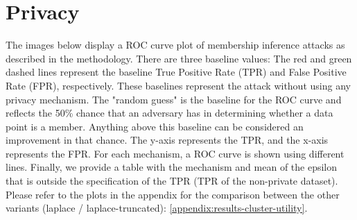 \section{Privacy}
The images below display a ROC curve plot of membership inference attacks as described in the methodology.
There are three baseline values: The red and green dashed lines represent the baseline True Positive Rate (TPR) and False Positive Rate (FPR), respectively. These baselines represent the attack without using any privacy mechanism. The "random guess" is the baseline for the ROC curve and reflects the 50\% chance that an adversary has in determining whether a data point is a member. Anything above this baseline can be considered an improvement in that chance.
The y-axis represents the TPR, and the x-axis represents the FPR. For each mechanism, a ROC curve is shown using different lines.
Finally, we provide a table with the mechanism and mean of the epsilon that is outside the specification of the TPR (TPR of the non-private dataset).
Please refer to the plots in the appendix for the comparison between the other variants (laplace / laplace-truncated): \ref{appendix:results-cluster-utility}.

